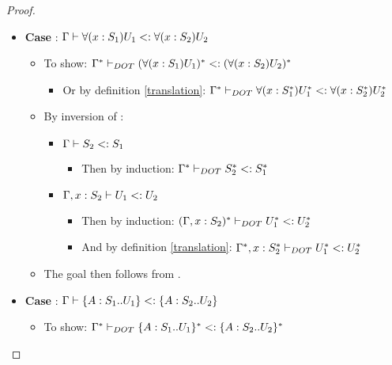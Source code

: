 \begin{proof}
\begin{itemize}
        \item \textbf{Case} :
            $\Gamma \vdash \forall(x:S_1)U_1 <: \forall(x:S_2)U_2$
        \begin{itemize}
            \item To show: $\Gamma^{*} \vdash_{DOT} (\forall(x:S_1)U_1)^{*} <: (\forall(x:S_2)U_2)^{*}$
            \begin{itemize}
                \item Or by definition \ref{translation}:
                    $\Gamma^{*} \vdash_{DOT} \forall(x:S_1^{*})U_1^{*} <: \forall(x:S_2^{*})U_2^{*}$
            \end{itemize}
            \item By inversion of :
            \begin{itemize}
                \item $\Gamma \vdash S_2 <: S_1$
                \begin{itemize}
                    \item Then by induction:
                        $\Gamma^{*} \vdash_{DOT} S_2^{*} <: S_1^{*}$
                \end{itemize}
                \item $\Gamma, x: S_2 \vdash U_1 <: U_2$
                \begin{itemize}
                    \item Then by induction: $(\Gamma, x: S_2)^{*} \vdash_{DOT} U_1^{*} <: U_2^{*}$
                    \item And by definition \ref{translation}:
                        $\Gamma^{*}, x:
                        S_2^{*} \vdash_{DOT} U_1^{*} <: U_2^{*}$
                \end{itemize}
            \end{itemize}
            \item The goal then follows from .
        \end{itemize}
        \item \textbf{Case} :
            $\Gamma \vdash \{A : S_1 .. U_1\} <: \{A : S_2 .. U_2\}$
        \begin{itemize}
            \item To show: $\Gamma^{*} \vdash_{DOT} \{A : S_1 .. U_1\}^{*} <: \{A : S_2 .. U_2\}^{*}$
            \begin{itemize}

\end{itemize}
\end{itemize}
\end{itemize}
\end{proof}
